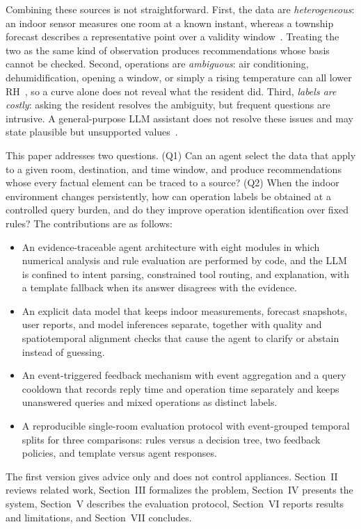 \documentclass[conference]{IEEEtran}
\begin{document}
Combining these sources is not straightforward. First, the data are \emph{heterogeneous}: an indoor sensor measures one room at a known instant, whereas a township forecast describes a representative point over a validity window~\cite{cwa_township}. Treating the two as the same kind of observation produces recommendations whose basis cannot be checked. Second, operations are \emph{ambiguous}: air conditioning, dehumidification, opening a window, or simply a rising temperature can all lower RH~\cite{nws_dewpoint}, so a curve alone does not reveal what the resident did. Third, \emph{labels are costly}: asking the resident resolves the ambiguity, but frequent questions are intrusive. A general-purpose LLM assistant does not resolve these issues and may state plausible but unsupported values~\cite{ji2023hallucination}.

This paper addresses two questions. (Q1) Can an agent select the data that apply to a given room, destination, and time window, and produce recommendations whose every factual element can be traced to a source? (Q2) When the indoor environment changes persistently, how can operation labels be obtained at a controlled query burden, and do they improve operation identification over fixed rules? The contributions are as follows:
\begin{itemize}
\item An evidence-traceable agent architecture with eight modules in which numerical analysis and rule evaluation are performed by code, and the LLM is confined to intent parsing, constrained tool routing, and explanation, with a template fallback when its answer disagrees with the evidence.
\item An explicit data model that keeps indoor measurements, forecast snapshots, user reports, and model inferences separate, together with quality and spatiotemporal alignment checks that cause the agent to clarify or abstain instead of guessing.
\item An event-triggered feedback mechanism with event aggregation and a query cooldown that records reply time and operation time separately and keeps unanswered queries and mixed operations as distinct labels.
\item A reproducible single-room evaluation protocol with event-grouped temporal splits for three comparisons: rules versus a decision tree, two feedback policies, and template versus agent responses.
\end{itemize}

The first version gives advice only and does not control appliances. Section~II reviews related work, Section~III formalizes the problem, Section~IV presents the system, Section~V describes the evaluation protocol, Section~VI reports results and limitations, and Section~VII concludes.
\end{document}
